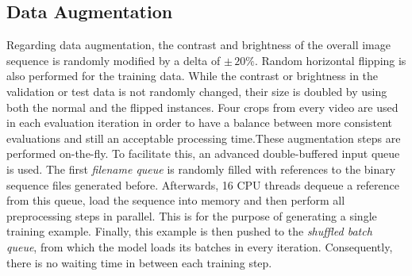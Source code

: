 \subsection{Data Augmentation}

Regarding data augmentation, the contrast and brightness of the overall image sequence is randomly modified by a delta of $ \pm\,20\% $. Random horizontal flipping is also performed for the training data. While the contrast or brightness in the validation or test data is not randomly changed, their size is doubled by using both the normal and the flipped instances. Four crops from every video are used in each evaluation iteration in order to have a balance between more consistent evaluations and still an acceptable processing time.These augmentation steps are performed on-the-fly. To facilitate this, an advanced double-buffered input queue is used. The first \textit{filename queue} is randomly filled with references to the binary sequence files generated before. Afterwards, \num{16} CPU threads dequeue a reference from this queue, load the sequence into memory and then perform all preprocessing steps in parallel. This is for the purpose of generating a single training example. Finally, this example is then pushed to the \textit{shuffled batch queue}, from which the model loads its batches in every iteration. Consequently, there is no waiting time in between each training step.

